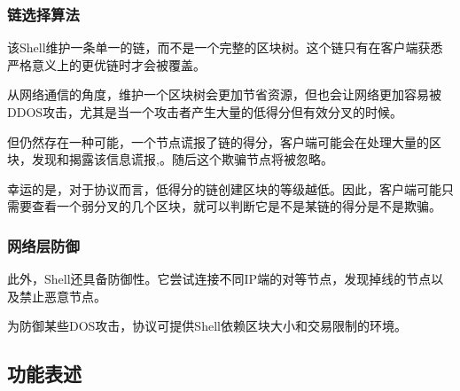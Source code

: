 \documentclass[letterpaper]{article}
\begin{document}
\subsubsection{链选择算法}
该Shell维护一条单一的链，而不是一个完整的区块树。这个链只有在客户端获悉严格意义上的更优链时才会被覆盖。

从网络通信的角度，维护一个区块树会更加节省资源，但也会让网络更加容易被DDOS攻击，尤其是当一个攻击者产生大量的低得分但有效分叉的时候。

但仍然存在一种可能，一个节点谎报了链的得分，客户端可能会在处理大量的区块，发现和揭露该信息谎报,。随后这个欺骗节点将被忽略。

幸运的是，对于协议而言，低得分的链创建区块的等级越低。因此，客户端可能只需要查看一个弱分叉的几个区块，就可以判断它是不是某链的得分是不是欺骗。

\subsubsection{网络层防御}
此外，Shell还具备防御性。它尝试连接不同IP端的对等节点，发现掉线的节点以及禁止恶意节点。

为防御某些DOS攻击，协议可提供Shell依赖区块大小和交易限制的环境。
\subsection{功能表述}
\end{document}
